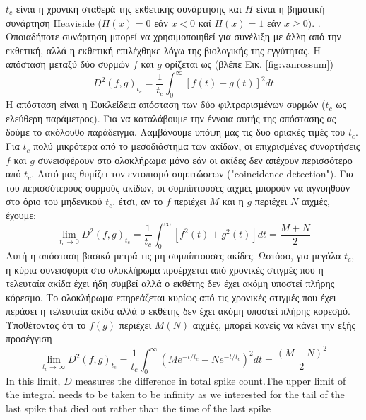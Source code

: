 \documentclass[12pt]{report}
\begin{document}
$t_{c}$ είναι η χρονική σταθερά της εκθετικής συνάρτησης και $H$ είναι η βηματική συνάρτηση \textlatin{Heaviside}  $(H(x)=0$ εάν $x<0$ καί $H(x)=1$ εάν $x \geq 0) .$ . Οποιαδήποτε συνάρτηση μπορεί να χρησιμοποιηθεί για συνέλιξη με άλλη από την εκθετική, αλλά η εκθετική επιλέχθηκε λόγω της βιολογικής της εγγύτητας. Η απόσταση μεταξύ δύο συρμών $f$ και $g$ ορίζεται ως (βλέπε Εικ. \ref{fig:vanrossum})
\begin{equation}
D^{2}(f, g)_{t_{c}}=\frac{1}{t_{c}} \int_{0}^{\infty}[f(t)-g(t)]^{2} d t
\end{equation}
Η απόσταση είναι η Ευκλείδεια απόσταση των δύο φιλτραρισμένων συρμών ($t_{c}$ ως ελεύθερη παράμετρος).
Για να καταλάβουμε την έννοια αυτής της απόστασης ας δούμε το ακόλουθο παράδειγμα. Λαμβάνουμε υπόψη μας τις δυο οριακές τιμές του $t_{c}.$ Για $t_{c}$ πολύ μικρότερα από το μεσοδιάστημα των ακίδων, οι επιχρισμένες συναρτήσεις $f$ και $g$ συνεισφέρουν στο ολοκλήρωμα μόνο εάν οι ακίδες δεν απέχουν περισσότερο από $t_{c}$. Αυτό μας θυμίζει τον εντοπισμό συμπτώσεων (\textlatin{"coincidence detection"}). Για του περισσότερους συρμούς ακίδων, οι συμπίπτουσες αιχμές μπορούν να αγνοηθούν στο όριο του μηδενικού $t_{c}$. έτσι, αν το $f$ περιέχει $M$ και η $g$ περιέχει $N$ αιχμές, έχουμε:
\begin{equation}
\lim _{t_{c} \rightarrow 0} D^{2}(f, g)_{t_{c}}=\frac{1}{t_{c}} \int_{0}^{\infty}\left[f^{2}(t)+g^{2}(t)\right] d t=\frac{M+N}{2}
\end{equation}
Αυτή η απόσταση βασικά μετρά τις μη συμπίπτουσες ακίδες.
Ωστόσο, για μεγάλα $t_{c}$, η κύρια συνεισφορά στο ολοκλήρωμα προέρχεται από χρονικές στιγμές που η τελευταία ακίδα έχει ήδη συμβεί αλλά ο εκθέτης δεν έχει ακόμη υποστεί πλήρης κόρεσμο. Το ολοκλήρωμα επηρεάζεται κυρίως από τις χρονικές στιγμές που έχει περάσει η τελευταία ακίδα αλλά ο εκθέτης δεν έχει ακόμη υποστεί πλήρης κορεσμό. Υποθέτοντας ότι το $f(g)$ περιέχει $M(N)$ αιχμές, μπορεί κανείς να κάνει την εξής προσέγγιση
\begin{equation}
\lim _{t_{c} \rightarrow \infty} D^{2}(f, g)_{t_{c}}=\frac{1}{t_{c}} \int_{0}^{\infty}\left(M e^{-t / t_{\mathrm{c}}}-N e^{-t / t_{c}}\right)^{2} d t=\frac{(M-N)^{2}}{2}
\end{equation}
In this limit, $D$ measures the difference in total spike count.The upper limit of the integral needs to be taken to be infinity as we interested for the tail of the last spike that died out rather than the time of the last spike
\end{document}
